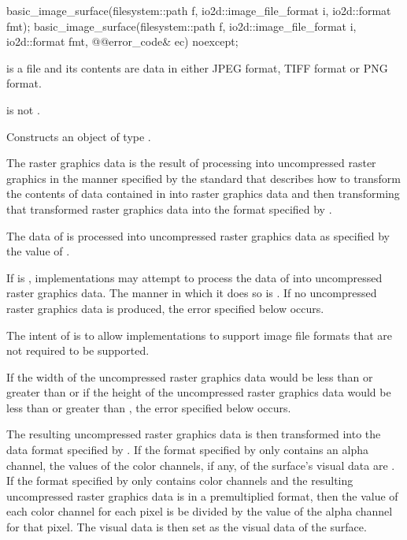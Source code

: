 %
\begin{itemdecl}
basic_image_surface(filesystem::path f, io2d::image_file_format i, io2d::format fmt);
basic_image_surface(filesystem::path f, io2d::image_file_format i, io2d::format fmt,
  @\stdqualifier{}@error_code& ec) noexcept;
\end{itemdecl}
\begin{itemdescr}
\pnum
\requires
{} is a file and its contents are data in either JPEG format, TIFF format or PNG format.

\pnum
{} is not .

\pnum
\effects
Constructs an object of type .

\pnum
The raster graphics data is the result of processing  into uncompressed raster graphics in the manner specified by the standard that describes how to transform the contents of data contained in  into raster graphics data and then transforming that transformed raster graphics data into the format specified by .

\pnum
The data of  is processed into uncompressed raster graphics data as specified by the value of .

\pnum
If  is , implementations may attempt to process the data of  into uncompressed raster graphics data. The manner in which it does so is \unspecnorm. If no uncompressed raster graphics data is produced, the error specified below occurs.

\pnum
\begin{note}
The intent of  is to allow implementations to support image file formats that are not required to be supported.
\end{note}

\pnum
If the width of the uncompressed raster graphics data would be less than  or greater than  or if the height of the uncompressed raster graphics data would be less than  or greater than , the error specified below occurs.

\pnum
The resulting uncompressed raster graphics data is then transformed into the data format specified by . If the format specified by  only contains an alpha channel, the values of the color channels, if any, of the surface's visual data are \unspecnorm. If the format specified by  only contains color channels and the resulting uncompressed raster graphics data is in a premultiplied format, then the value of each color channel for each pixel is be divided by the value of the alpha channel for that pixel. The visual data is then set as the visual data of the surface.


\end{itemdescr}
